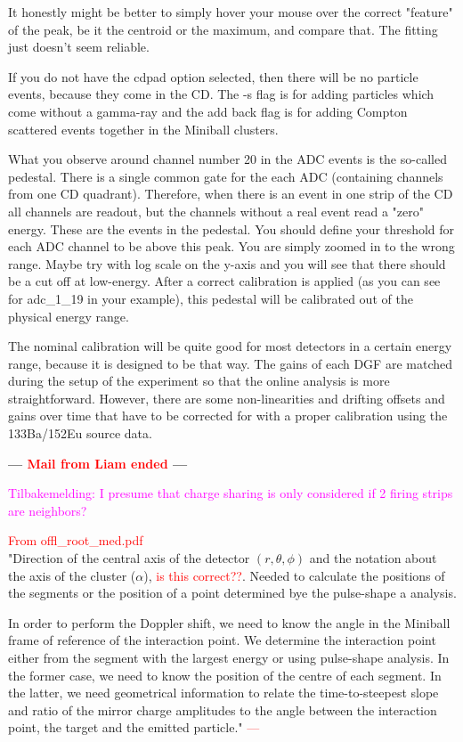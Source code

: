 \documentclass[twoside,english]{uiofysmaster/uiofysmaster}
\begin{document}
It honestly might be better to simply hover your mouse over the correct "feature" of the peak, be it the centroid or the maximum, and compare that. The fitting just doesn't seem reliable.

If you do not have the cdpad option selected, then there will be no particle events, because they come in the CD. The -s flag is for adding particles which come without a gamma-ray and the add back flag is for adding Compton scattered events together in the Miniball clusters. 

What you observe around channel number 20 in the ADC events is the so-called pedestal. There is a single common gate for the each ADC (containing channels from one CD quadrant). Therefore, when there is an event in one strip of the CD all channels are readout,  but the channels without a real event read a "zero" energy. These are the events in the pedestal. You should define your threshold for each ADC channel to be above this peak. You are simply zoomed in to the wrong range. Maybe try with log scale on the y-axis and you will see that there should be a cut off at low-energy. After a correct calibration is applied (as you can see for adc\_1\_19 in your example), this pedestal will be calibrated out of the physical energy range.

The nominal calibration will be quite good for most detectors in a certain energy range, because it is designed to be that way. The gains of each DGF are matched during the setup of the experiment so that the online analysis is more straightforward. However, there are some non-linearities and drifting offsets and gains over time that have to be corrected for with a proper calibration using the 133Ba/152Eu source data. 

\textbf{--- \textcolor{red}{Mail from Liam ended} ---}

\textcolor{Magenta}{Tilbakemelding: \newline 
I presume that charge sharing is only considered if 2 firing strips are neighbors?
}




\textcolor{red}{From offl\_root\_med.pdf} \\
"Direction of the central axis of the detector $(r, \theta, \phi)$ and the notation about the axis of the cluster ($\alpha$), \textcolor{red}{is this correct??}. Needed to calculate the positions of the segments or the position of a point determined bye the pulse-shape a analysis.

In order to perform the Doppler shift, we need to know the angle in the Miniball frame of reference of the interaction point. We determine the interaction point either from the segment with the largest energy or using pulse-shape analysis. In the former case, we need to know the position of the centre of each segment. In the latter, we need geometrical information to relate the time-to-steepest slope and ratio of the mirror charge amplitudes to the angle between the interaction point, the target and the emitted particle." \newline
\textcolor{red}{---}
\end{document}
